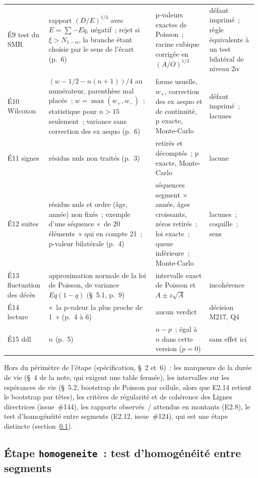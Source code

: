 \documentclass[a4paper,11pt]{article}
\newcommand{\code}[1]{\texttt{\small #1}}
\begin{document}
{\begin{longtable}{@{}p{2.3cm}p{5.0cm}p{4.6cm}p{2.7cm}@{}}
É9 test du SMR & rapport $(D/E)^{1/3}$ avec $E = \sum -E\tilde q$, négatif~; rejet si $\xi > N_{1-\alpha}$, la branche étant choisie par le sens de l'écart (p.~6) & p-valeurs exactes de Poisson~; racine cubique corrigée en $(A/O)^{1/3}$ & défaut imprimé~; règle équivalente à un test bilatéral de niveau $2\alpha$ \\
É10 Wilcoxon & $(w - 1/2 - n(n+1))/4$ au numérateur, parenthèse mal placée~; $w = \max(w_{+}, w_{-})$~; statistique pour $n > 15$ seulement~; variance sans correction des ex aequo (p.~6) & forme usuelle, $w_{+}$, correction des ex aequo et de continuité, p exacte, Monte-Carlo & défaut imprimé~; lacunes \\
É11 signes & résidus nuls non traités (p.~3) & retirés et décomptés~; p exacte, Monte-Carlo & lacune \\
É12 suites & résidus nuls et ordre (âge, année) non fixés~; exemple d'une séquence «~de 20 éléments~» qui en compte 21~; p-valeur bilatérale (p.~4) & séquences segment $\times$ année, âges croissants, zéros retirés~; loi exacte~; queue inférieure~; Monte-Carlo & lacunes~; coquille~; sens \\
É13 fluctuation des décès & approximation normale de la loi de Poisson, de variance $E q(1 - q)$ (§~5.1, p.~9) & intervalle exact de Poisson et $A \pm z\sqrt{A}$ & incohérence \\
É14 lecture & «~la p-valeur la plus proche de 1~» (p.~4 à 6) & aucun verdict & décision M217, Q4 \\
É15 ddl & $n$ (p.~5) & $n - p$~; égal à $n$ dans cette version ($p = 0$) & sans effet ici \\
\end{longtable}
}

\noindent
Hors du périmètre de l'étape (spécification, §~2 et~6)~: les marqueurs de
la durée de vie (§~4 de la note, qui exigent une table fermée), les
intervalles sur les espérances de vie (§~5.2, bootstrap de Poisson par
cellule, alors que E2.14 retient le bootstrap par têtes), les critères de
régularité et de cohérence des Lignes directrices (issue~\#144), les
rapports observés~/ attendus en montants (E2.8), le test d'homogénéité entre
segments (E2.12, issue~\#124), qui est une étape distincte
(section~\ref{sec:homogeneite}).

\subsection{Étape \code{homogeneite}~: test d'homogénéité entre segments}
\label{sec:homogeneite}
\end{document}
